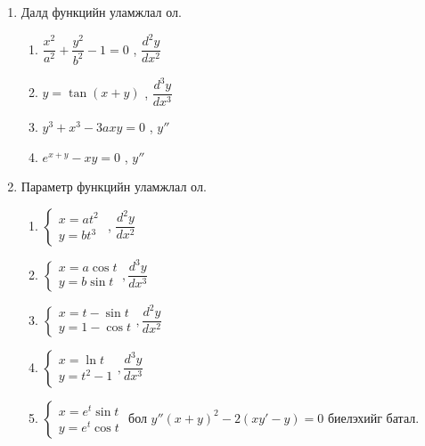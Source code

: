 \begin{enumerate}
\begin{enumerate}
  \item $y = e^{ax}$
  \item $y = e^{-x}$
  \item $y = \sin^2x$
  \item $y = xe^x$
  \item $y = x\ln x$
  \item $y = (x^2+x-1)\cos x$
  \item $y = e^{x}\cos x$
  \item $y = x^{n-1}e^{\frac{1}{x}}$
\end{enumerate}
\item Далд функцийн уламжлал ол.
\begin{enumerate}
    \item $\dfrac{x^2}{a^2}+\dfrac{y^2}{b^2}-1=0$ , $\dfrac{d^2y}{dx^2}$
    \item $y=\tan(x+y)$ , $\dfrac{d^3y}{dx^3}$
    \item $y^3+x^3-3axy=0$ , $y''$
    \item $e^{x+y}-xy=0$ , $y''$
\end{enumerate}
\item Параметр функцийн уламжлал ол.
\begin{enumerate}
    \item
    $\begin{cases}
        x=at^2\\
        y=bt^3
    \end{cases}$ , $\dfrac{d^2y}{dx^2}$
      \item 
     $ \begin{cases}
        x=a\cos t\\
        y=b\sin t
    \end{cases} , \dfrac{d^3y}{dx^3}$
      \item 
      $\begin{cases}
        x=t-\sin t\\
        y=1-\cos t
    \end{cases} , \dfrac{d^2y}{dx^2}$
      \item 
      $\begin{cases}
        x=\ln t\\
        y=t^2-1
    \end{cases} , \dfrac{d^3y}{dx^3}$  
    \item 
    $\begin{cases}
        x=e^t\sin t\\
        y=e^t\cos t
    \end{cases}$ бол $y''(x+y)^2-2(xy'-y)=0$ биелэхийг батал.
\end{enumerate}
\end{enumerate}